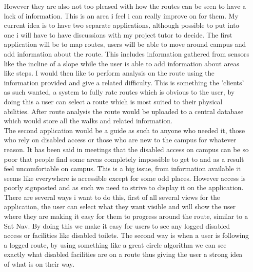 \documentclass[10pt,a4paper]{article}
\begin{document}
\noindent
However they are also not too pleased with how the routes can be seen to have a lack of information. This is an area i feel i can really improve on for them. My current idea is to have two separate applications, although possible to put into one i will have to have discussions with my project tutor to decide. The first application will be to map routes, users will be able to move around campus and add information about the route. This includes information gathered from sensors like the incline of a slope while the user is able to add information about areas like steps. I would then like to perform analysis on the route using the information provided and give a related difficulty. This is something the 'clients' as such wanted, a system to fully rate routes which is obvious to the user, by doing this a user can select a route which is most suited to their physical abilities. After route analysis the route would be uploaded to a central database which would store all the walks and related information. \\

\noindent
The second application would be a guide as such to anyone who needed it, those who rely on disabled access or those who are new to the campus for whatever reason. It has been said in meetings that the disabled access on campus can be so poor that people find some areas completely impossible to get to and as a result feel uncomfortable on campus. This is a big issue, from information available it seems like everywhere is accessible except for some odd places. However access is poorly signposted and as such we need to strive to display it on the application. There are several ways i want to do this, first of all several views for the application, the user can select what they want visible and will show the user where they are making it easy for them to progress around the route, similar to a Sat Nav. By doing this we make it easy for users to see any logged disabled access or facilities like disabled toilets. The second way is when a user is following a logged route, by using something like a great circle algorithm we can see exactly what disabled facilities are on a route thus giving the user a strong idea of what is on their way.\\
\end{document}
